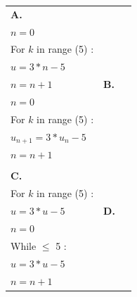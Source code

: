 \begin{tabularx}{\linewidth}{*{2}{X}}
\textbf{A.~~}
\fbox{
\begin{minipage}[t]{3cm}
$u=4$ \\
$n=0$\\
For $k$ in range (5) :\\
\hspace*{0.3cm}$u=3*n-5$\\
\hspace*{0.3cm}$n=n+1$
\end{minipage}}&
\textbf{B.~~} \fbox{
\begin{minipage}[t]{3cm}
 $u=4$\\
 $n=0$ \\
 For $k$ in range (5) :\\
\hspace*{0.3cm}$u_{n+1}=3*u_n-5$\\
\hspace*{0.3cm}$n=n+1$
 \end{minipage}}\\
 &\\
\textbf{C.~~}\fbox{\begin{minipage}[t]{3cm}
$u=4$ \\
For $k$ in range (5) :\\
\hspace*{0.3cm}$u=3*u-5$
\end{minipage}}&
\textbf{D.~~}\fbox{\begin{minipage}[t]{3cm}
$u=4$\\
$n=0$\\
While $\leqslant$ 5 :\\
\hspace*{0.3cm}$u=3*u-5$\\
\hspace*{0.3cm}$n=n+1$
\end{minipage}}
\end{tabularx}

\vspace{1cm}
